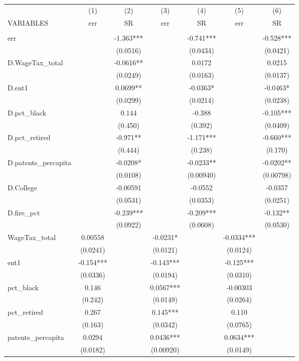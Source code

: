 \begin{tabular}{lcccccc} \hline
 & (1) & (2) & (3) & (4) & (5) & (6) \\
VARIABLES & err & SR & err & SR & err & SR \\ \hline
 &  &  &  &  &  &  \\
err &  & -1.363*** &  & -0.741*** &  & -0.528*** \\
 &  & (0.0516) &  & (0.0434) &  & (0.0421) \\
D.WageTax\_total &  & -0.0616** &  & 0.0172 &  & 0.0215 \\
 &  & (0.0249) &  & (0.0163) &  & (0.0137) \\
D.ent1 &  & 0.0699** &  & -0.0363* &  & -0.0463* \\
 &  & (0.0299) &  & (0.0214) &  & (0.0238) \\
D.pct\_black &  & 0.144 &  & -0.388 &  & -0.105*** \\
 &  & (0.450) &  & (0.392) &  & (0.0409) \\
D.pct\_retired &  & -0.971** &  & -1.171*** &  & -0.660*** \\
 &  & (0.444) &  & (0.238) &  & (0.170) \\
D.patents\_percapita &  & -0.0208* &  & -0.0233** &  & -0.0202** \\
 &  & (0.0108) &  & (0.00940) &  & (0.00798) \\
D.College &  & -0.00591 &  & -0.0552 &  & -0.0357 \\
 &  & (0.0531) &  & (0.0353) &  & (0.0251) \\
D.fire\_pct &  & -0.239*** &  & -0.209*** &  & -0.132** \\
 &  & (0.0922) &  & (0.0608) &  & (0.0530) \\
WageTax\_total & 0.00558 &  & -0.0231* &  & -0.0334*** &  \\
 & (0.0241) &  & (0.0121) &  & (0.0124) &  \\
ent1 & -0.154*** &  & -0.143*** &  & -0.125*** &  \\
 & (0.0336) &  & (0.0194) &  & (0.0310) &  \\
pct\_black & 0.146 &  & 0.0567*** &  & -0.00303 &  \\
 & (0.242) &  & (0.0149) &  & (0.0264) &  \\
pct\_retired & 0.267 &  & 0.145*** &  & 0.110 &  \\
 & (0.163) &  & (0.0342) &  & (0.0765) &  \\
patents\_percapita & 0.0294 &  & 0.0436*** &  & 0.0634*** &  \\
 & (0.0182) &  & (0.00920) &  & (0.0149) &  \\

\end{tabular}
